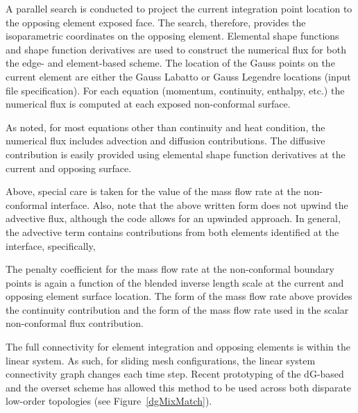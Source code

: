 A parallel search is conducted to project the current integration point location to the opposing element exposed face. 
The search, therefore, provides the isoparametric coordinates on the opposing element. Elemental shape functions 
and shape function derivatives are used to construct the numerical flux for both the edge- and element-based 
scheme. The location of the Gauss points on the current element are either the Gauss Labatto or Gauss Legendre 
locations (input file specification). For each equation (momentum, continuity, enthalpy, etc.) the numerical 
flux is computed at each exposed non-conformal surface.

As noted, for most equations other than continuity and heat condition, the numerical flux includes advection and 
diffusion contributions. The diffusive contribution is easily provided using elemental shape function derivatives 
at the current and opposing surface. 

Above, special care is taken for the value of the mass flow rate at the non-conformal interface. Also,
note that the above written form does not upwind the advective flux, although the code allows for an upwinded 
approach. In general, the advective term contains contributions from both elements identified at the interface, 
specifically,

The penalty coefficient for the mass flow rate at the non-conformal boundary points is again a function of the 
blended inverse length scale at the current and opposing element surface location. The form of the mass flow 
rate above provides the continuity contribution and the form of the mass flow rate used in the scalar non-conformal
flux contribution.

The full connectivity for element integration and opposing elements is within the linear 
system. As such, for sliding mesh configurations, the linear system connectivity graph changes each time step. Recent prototyping of 
the dG-based and the overset scheme has allowed this method to be used across both disparate low-order 
topologies (see Figure~\ref{dgMixMatch}).

